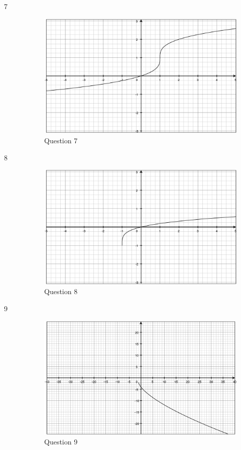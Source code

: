 \documentclass[fleqn,addpoints]{exam}
\begin{document}
\begin{description}
\item[7]
\begin{figure}[H]
  \centering
  \includegraphics[scale=.3]{question7.eps}
  \caption*{Question 7}
\end{figure}

\item[8]
\begin{figure}[H]
  \centering
  \includegraphics[scale=.3]{question8.eps}
  \caption*{Question 8}
\end{figure}

\item[9]
\begin{figure}[H]
  \centering
  \includegraphics[scale=.3]{question9.eps}
  \caption*{Question 9}
\end{figure}


\end{description}
\end{document}
